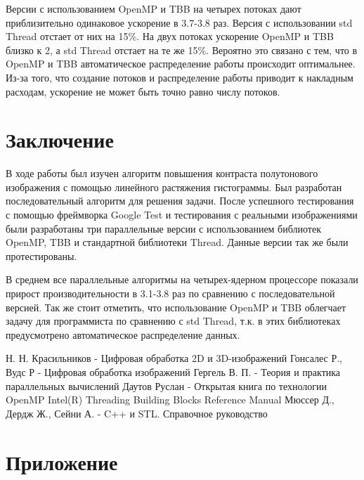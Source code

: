 \documentclass{report}
\begin{document}
    \par Версии с использованием OpenMP и TBB на четырех потоках дают приблизительно одинаковое ускорение в 3.7-3.8 раз. Версия с использовании std Thread отстает от них на 15\%. На двух потоках ускорение OpenMP и TBB близко к 2, а std Thread отстает на те же 15\%. Вероятно это связано с тем, что в OpenMP и TBB автоматическое распределение работы происходит оптимальнее. Из-за того, что создание потоков и распределение работы приводит к накладным расходам, ускорение не может быть точно равно числу потоков.
    
    \newpage
	\section*{Заключение}
	
	\par В ходе работы был изучен алгоритм повышения контраста полутонового изображения с помощью линейного растяжения гистограммы. Был разработан последовательный алгоритм для решения задачи. После успешного тестирования с помощью фреймворка Google Test и тестирования с реальными изображениями были разработаны три параллельные версии с использованием библиотек OpenMP, TBB и стандартной библиотеки Thread. Данные версии так же были протестированы.
	
	В среднем все параллельные алгоритмы на четырех-ядерном процессоре показали прирост производительности  в 3.1-3.8 раз по сравнению с последовательной версией. Так же стоит отметить, что использование OpenMP и TBB облегчает задачу для программиста по сравнению с std Thread, т.к. в этих библиотеках предусмотрено автоматическое распределение данных.
	
	\newpage
	\begin{thebibliography}{1}
		 Н. Н. Красильников - Цифровая обработка 2D и 3D-изображений
		 Гонсалес Р., Вудс Р - Цифровая обработка изображений
		 Гергель В. П. - Теория и практика параллельных вычислений
		 Даутов Руслан - Открытая книга по технологии OpenMP
		 Intel(R) Threading Building Blocks Reference Manual
		 Мюссер Д., Дердж Ж., Сейни А. - C++ и STL. Справочное руководство
	\end{thebibliography}
	
	\newpage
	\section*{Приложение}
	
\end{document}
